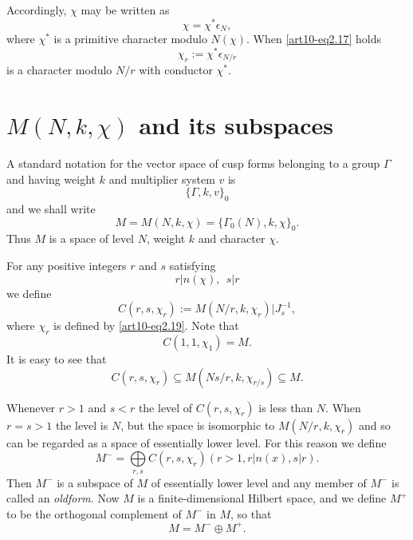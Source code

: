 Accordingly, $\chi$ may be written as
\begin{equation}
\chi = \chi^{*}\epsilon_{N},\label{art10-eq2.18}
\end{equation}
where $\chi^{*}$ is a primitive character modulo $N(\chi)$. When \eqref{art10-eq2.17} holds 
\begin{equation}
\chi_{r} := \chi^{*}\epsilon_{N/r}\label{art10-eq2.19}
\end{equation}
is a character modulo $N/r$ with conductor $\chi^{*}$.

\section{$M(N,k,\chi)$ and its subspaces}\label{art10-sec3}
A standard notation for the vector space of cusp forms belonging to a group $\Gamma$ and having weight $k$ and multiplier system $v$ is
\setcounter{equation}{0}
\begin{equation}
\{\Gamma, k, v\}_{0}\label{art10-eq3.1}
\end{equation}
and we shall write
\begin{equation}
M=M(N,k,\chi)=\{\Gamma_{0}(N),k,\chi\}_{0}.\label{art10-eq3.2}
\end{equation}
Thus $M$ is a space of level $N$, weight $k$ and character $\chi$.

For any positive integers $r$ and $s$ satisfying
\begin{equation}
r|n(\chi), \ \ s|r\label{art10-eq3.3}
\end{equation}
we define
\begin{equation}
C(r,s,\chi_{r}):= M(N/r,k,\chi_{r})|J^{-1}_{s},\label{art10-eq3.4}
\end{equation}
where $\chi_{r}$ is defined by \eqref{art10-eq2.19}. Note that
\begin{equation}
C(1,1,\chi_{1})=M.\label{art10-eq3.5}
\end{equation}
It is easy to see that
\begin{equation}
C(r,s,\chi_{r})\subseteq M(Ns/r,k,\chi_{r/s})\subseteq M.\label{art10-eq3.6}
\end{equation}

Whenever $r>1$ and $s<r$ the level of $C(r,s,\chi_{r})$ is less than $N$. When $r=s>1$ the level is $N$, but the space is isomorphic to $M(N/r,k,\chi_{r})$ and so can be regarded as a space of essentially lower level. For this reason we define
\begin{equation}
M^{-}=\bigoplus\limits_{r,s}C(r,s,\chi_{r})(r>1, r|n(x),s|r).\label{art10-eq3.7}
\end{equation}
Then $M^{-}$ is a subspace of $M$ of essentially lower level and any member of $M^{-}$ is called an {\em oldform}. Now $M$ is a finite-dimensional Hilbert space, and we define $M^{+}$ to be the orthogonal complement of $M^{-}$ in $M$, so that
\begin{equation}
M=M^{-}\oplus M^{+}.\label{art10-eq3.8}
\end{equation}

